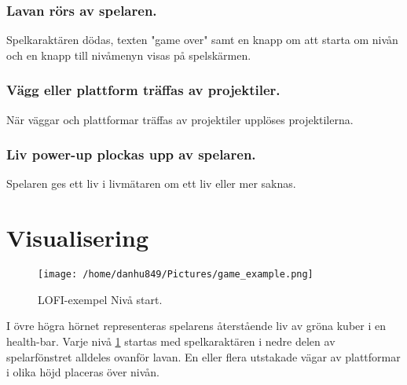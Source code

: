 \documentclass{TDP005mall}
\begin{document}
\subsubsection*{Lavan rörs av spelaren.}
Spelkaraktären dödas, texten "game over" samt en knapp om att starta om nivån och en knapp till nivåmenyn visas på spelskärmen.

\subsubsection*{Vägg eller plattform träffas av projektiler.}
När väggar och plattformar träffas av projektiler upplöses projektilerna.

\subsubsection*{Liv power-up plockas upp av spelaren.}
Spelaren ges ett liv i livmätaren om ett liv eller mer saknas. 

\newpage
\section{Visualisering}%

\begin{figure}[h!]
  \caption{LOFI-exempel Nivå start.\label{fig:4}}
  \centerline{\texttt{[image: /home/danhu849/Pictures/game\_example.png]}}  
\end{figure}

I övre högra hörnet representeras spelarens återstående liv av gröna kuber i en health-bar. Varje nivå \ref{fig:4} startas med spelkaraktären i nedre delen av spelarfönstret alldeles ovanför lavan. En eller flera utstakade vägar av plattformar i olika höjd placeras över nivån.
\end{document}
